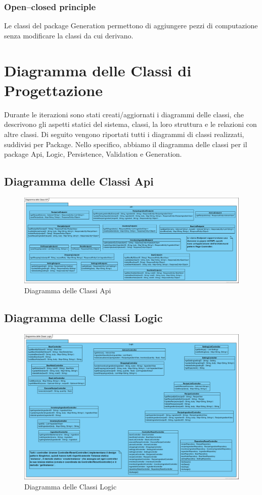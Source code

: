 \documentclass[a4paper,12pt]{report}
\begin{document}
			\subsubsection{Open–closed principle}
Le classi del package Generation permettono di aggiungere pezzi di computazione senza modificare la classi da cui derivano.

         
         \section{Diagramma delle Classi di Progettazione}
Durante le iterazioni sono stati creati/aggiornati i diagrammi delle classi, che descrivono gli aspetti statici del sistema, classi, la loro struttura e le relazioni con altre classi.
Di seguito vengono riportati tutti i diagrammi di classi realizzati, suddivisi per Package. Nello specifico, abbiamo il diagramma delle classi per il package Api, Logic, Persistence, Validation e Generation.

		\subsection{Diagramma delle Classi Api}
			\begin{figure}[!h]
				\centering
				\includegraphics[width=01\linewidth]{image/Diagramma-delle-Classi-Api.png}
				\caption{Diagramma delle Classi  Api}\label{fig:1}
			\end{figure}         		
\newpage			
  		\subsection{Diagramma delle Classi Logic}
			\begin{figure}[!h]
				\centering
				\includegraphics[width=0.9\linewidth]{image/Diagramma-delle-Classi-Logic.png}
				\caption{Diagramma delle Classi Logic  }\label{fig:1}
			\end{figure}  
			
\end{document}
